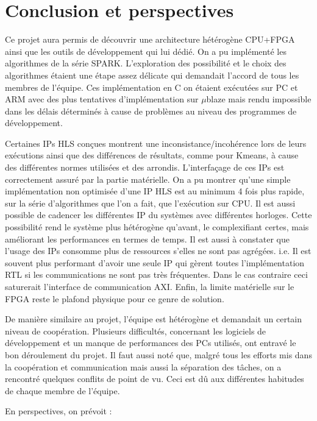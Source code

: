 \documentclass[12pt,a4paper]{ieee}
\begin{document}
\section{Conclusion et perspectives}
Ce projet aura permis de découvrir une architecture hétérogène CPU+FPGA ainsi que les outils de développement qui lui dédié. On a pu implémenté les algorithmes de la série SPARK. L'exploration des possibilité et le choix des algorithmes étaient une étape assez délicate qui demandait l'accord de tous les membres de l'équipe. Ces implémentation en C on étaient exécutées sur PC et ARM avec des plus tentatives d'implémentation sur $\mu$blaze mais rendu impossible dans les délais déterminés à cause de problèmes au niveau des programmes de développement.

Certaines IPs HLS conçues montrent une inconsistance/incohérence lors de leurs exécutions ainsi que des différences de résultats, comme pour Kmeans, à cause des différentes normes utilisées et des arrondis. L'interfaçage de ces IPs est correctement assuré par la partie matérielle. On a pu montrer qu'une simple implémentation non optimisée d'une IP HLS est au minimum 4 fois plus rapide, sur la série d'algorithmes que l'on a fait, que l'exécution sur CPU. Il est aussi possible de cadencer les différentes IP du systèmes avec différentes horloges. Cette possibilité rend le système plus hétérogène qu'avant, le complexifiant certes, mais améliorant les performances en termes de temps. Il est aussi à constater que l'usage des IPs consomme plus de ressources s'elles ne sont pas agrégées. i.e. Il est souvent plus performant d'avoir une seule IP qui gèrent toutes l'implémentation RTL si les communications ne sont pas très fréquentes. Dans le cas contraire ceci saturerait l'interface de communication AXI. Enfin, la limite matérielle sur le FPGA reste le plafond physique pour ce genre de solution.


De manière similaire au projet, l'équipe est hétérogène et demandait un certain niveau de coopération. Plusieurs difficultés, concernant les logiciels de développement et un manque de performances des PCs utilisés, ont entravé le bon déroulement du projet. Il faut aussi noté que, malgré tous les efforts mis dans la coopération et communication mais aussi la séparation des tâches, on a rencontré quelques conflits de point de vu. Ceci est dû aux différentes habitudes de chaque membre de l'équipe.


En perspectives, on prévoit :
\end{document}
